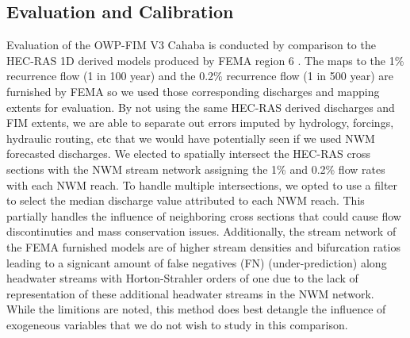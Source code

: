 \subsection{Evaluation and Calibration}
\label{ssec:evaluation_and_calibration}
%
Evaluation of the OWP-FIM V3 Cahaba is conducted by comparison to the HEC-RAS 1D derived models produced by FEMA region 6 \cite{fema2021base,fema2021estimated}.
The maps to the 1\% recurrence flow (1 in 100 year) and the 0.2\% recurrence flow (1 in 500 year) are furnished by FEMA so we used those corresponding discharges and mapping extents for evaluation.
By not using the same HEC-RAS derived discharges and FIM extents, we are able to separate out errors imputed by hydrology, forcings, hydraulic routing, etc that we would have potentially seen if we used NWM forecasted discharges.
We elected to spatially intersect the HEC-RAS cross sections with the NWM stream network assigning the 1\% and 0.2\% flow rates with each NWM reach. 
To handle multiple intersections, we opted to use a filter to select the median discharge value attributed to each NWM reach.
This partially handles the influence of neighboring cross sections that could cause flow discontinuties and mass conservation issues.
Additionally, the stream network of the FEMA furnished models are of higher stream densities and bifurcation ratios leading to a signicant amount of false negatives (FN) (under-prediction) along headwater streams with Horton-Strahler orders of one due to the lack of representation of these additional headwater streams in the NWM network.
While the limitions are noted, this method does best detangle the influence of exogeneous variables that we do not wish to study in this comparison.

